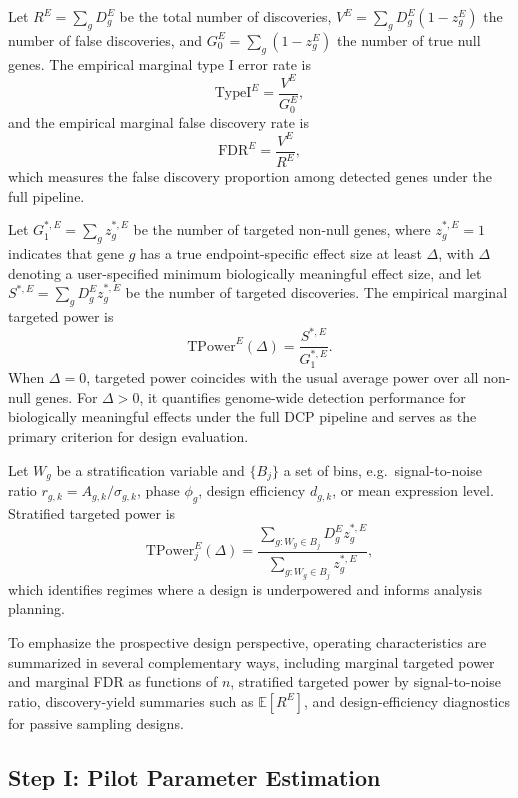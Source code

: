 \documentclass{article}
\begin{document}
Let $R^E=\sum_g D_g^E$ be the total number of discoveries,
$V^E=\sum_g D_g^E(1-z_g^E)$ the number of false discoveries, and
$G_0^E=\sum_g(1-z_g^E)$ the number of true null genes.
The empirical marginal type I error rate is
\[
\mathrm{TypeI}^E=\frac{V^E}{G_0^E},
\]
and the empirical marginal false discovery rate is
\[
\mathrm{FDR}^E=\frac{V^E}{R^E},
\]
which measures the false discovery proportion among detected genes under the
full pipeline.

Let $G_1^{*,E}=\sum_g z_g^{*,E}$ be the number of targeted non-null genes,
where $z_g^{*,E}=1$ indicates that gene $g$ has a true endpoint-specific effect
size at least $\Delta$, with $\Delta$ denoting a user-specified minimum
biologically meaningful effect size, and let
$S^{*,E}=\sum_g D_g^E z_g^{*,E}$ be the number of targeted discoveries.
The empirical marginal targeted power is
\begin{equation}
\mathrm{TPower}^E(\Delta)=\frac{S^{*,E}}{G_1^{*,E}}.
\label{eq:tpower_def}
\end{equation}
When $\Delta=0$, targeted power coincides with the usual average power over all
non-null genes. For $\Delta>0$, it quantifies genome-wide detection
performance for biologically meaningful effects under the full DCP pipeline and
serves as the primary criterion for design evaluation.

Let $W_g$ be a stratification variable and $\{B_j\}$ a set of bins, e.g.\
signal-to-noise ratio $r_{g,k}=A_{g,k}/\sigma_{g,k}$, phase $\phi_g$, design
efficiency $d_{g,k}$, or mean expression level. Stratified targeted power is
\begin{equation}
\mathrm{TPower}_j^E(\Delta)
=
\frac{\sum_{g:W_g\in B_j} D_g^E z_g^{*,E}}
{\sum_{g:W_g\in B_j} z_g^{*,E}},
\label{eq:tpower_strat_def}
\end{equation}
which identifies regimes where a design is underpowered and informs analysis
planning.

To emphasize the prospective design perspective, operating characteristics are
summarized in several complementary ways, including marginal targeted power and
marginal FDR as functions of $n$, stratified targeted power by signal-to-noise
ratio, discovery-yield summaries such as $\mathbb{E}[R^E]$, and
design-efficiency diagnostics for passive sampling designs.

\subsection{Step I: Pilot Parameter Estimation}
\label{sec:pilot}
\end{document}
